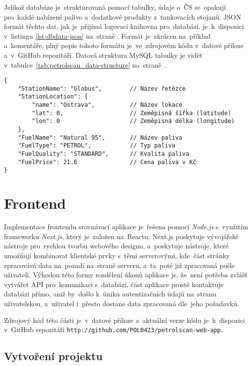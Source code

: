 Jelikož databáze je~strukturovaná pomocí tabulky, údaje o~ČS se~opakují
pro~každé nabízené palivo a~dodatkové produkty z~tankovacích stojanů.
JSON formát těchto dat, jak je~přijímá logovací knihovna pro~databázi,
je~k~dispozici v~listingu \ref{lst:dbdata-json}
na~straně \pageref{lst:dbdata-json}. Formát je~zkrácen na~příklad
a~komentáře, plný popis tohoto formátu je~ve~zdrojovém kódu v~datové příloze
a~v~GitHub repozitáři. Datová struktura MySQL tabulky je vidět
v~tabulce~\ref{tab:petrolscan_data-structure}
na~straně~\pageref{tab:petrolscan_data-structure}.

\begin{lstlisting}[caption={JSON formát dat pro logovací knihovnu},label=lst:dbdata-json]
{
    "StationName": "Globus",        // Název řetězce
    "StationLocation": {
        "name": "Ostrava",          // Název lokace
        "lat": 0,                   // Zeměpisná šířka (latitude)
        "lon": 0                    // Zeměpisná délka (longitude)
    },
    "FuelName": "Natural 95",       // Název paliva
    "FuelType": "PETROL",           // Typ paliva
    "FuelQuality": "STANDARD",      // Kvalita paliva
    "FuelPrice": 21.6               // Cena paliva v Kč
}
\end{lstlisting}

\section{Frontend}
\label{sec:development-frontend}

Implementace frontendu srovnávací aplikace je~řešena pomocí \emph{Node.js}
s~využitím frameworku \emph{Next.js}, který je~založen na~Reactu. Next.js
poskytuje vývojářské nástroje pro~rychlou tvorbu webového designu, a~poskytuje
nástroje, které umožňují kombinovat klientské prvky s~těmi serverovými,
kde~část stránky zpracovává data na~pozadí na~straně serveru, a~ta~poté již
zpracovaná pošle uživateli. Výhodou této formy rozdělení úkonů aplikace je,
že~není potřeba zvlášť vytvářet API pro~komunikaci s~databází, část aplikace
prostě kontaktuje databázi přímo, aniž by~došlo k~úniku autentizačních
údajů na~stranu uživatelskou, a~uživatel i~přesto dostane data zpracovaná
dle~jeho požadavků.

Zdrojový kód této části je~v~datové příloze a~aktuální verze kódu
je~k~dispozici v~GitHub repozitáři
\texttt{http://github.com/POL0423/petrolscan-web-app}.

\subsection{Vytvoření projektu}

